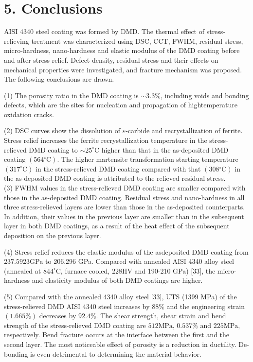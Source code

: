 \documentclass[10pt]{article}
\begin{document}
\section*{5. Conclusions}
AISI 4340 steel coating was formed by DMD. The thermal effect of stress-relieving treatment was characterized using DSC, CCT, FWHM, residual stress, micro-hardness, nano-hardness and elastic modulus of the DMD coating before and after stress relief. Defect density, residual stress and their effects on mechanical properties were investigated, and fracture mechanism was proposed. The following conclusions are drawn.

(1) The porosity ratio in the DMD coating is $\sim 3.3 \%$, including voids and bonding defects, which are the sites for nucleation and propagation of hightemperature oxidation cracks.

(2) DSC curves show the dissolution of $\varepsilon$-carbide and recrystallization of ferrite. Stress relief increases the ferrite recrystallization temperature in the stress-relieved DMD coating to $\sim 25^{\circ} \mathrm{C}$ higher than that in the as-deposited DMD coating $\left(564{ }^{\circ} \mathrm{C}\right)$. The higher martensite transformation starting temperature $\left(317^{\circ} \mathrm{C}\right)$ in the stress-relieved DMD coating compared with that $\left(308{ }^{\circ} \mathrm{C}\right)$ in the as-deposited DMD coating is attributed to the relieved residual stress.\\
(3) FWHM values in the stress-relieved DMD coating are smaller compared with those in the as-deposited DMD coating. Residual stress and nano-hardness in all three stress-relieved layers are lower than those in the as-deposited counterparts. In addition, their values in the previous layer are smaller than in the subsequent layer in both DMD coatings, as a result of the heat effect of the subsequent deposition on the previous layer.

(4) Stress relief reduces the elastic modulus of the asdeposited DMD coating from $237.5923 \mathrm{GPa}$ to 206.296 GPa. Compared with annealed AISI 4340 alloy steel (annealed at $844^{\circ} \mathrm{C}$, furnace cooled, $228 \mathrm{HV}$ and 190-210 GPa) [33], the micro-hardness and elasticity modulus of both DMD coatings are higher.

(5) Compared with the annealed 4340 alloy steel [33], UTS (1399 MPa) of the stress-relieved DMD AISI 4340 steel increases by $88 \%$ and the engineering strain $(1.665 \%)$ decreases by $92.4 \%$. The shear strength, shear strain and bend strength of the stress-relieved DMD coating are $512 \mathrm{MPa}$, $0.537 \%$ and $225 \mathrm{MPa}$, respectively. Bend fracture occurs at the interface between the first and the second layer. The most noticeable effect of porosity is a reduction in ductility. De-bonding is even detrimental to determining the material behavior.
\end{document}

